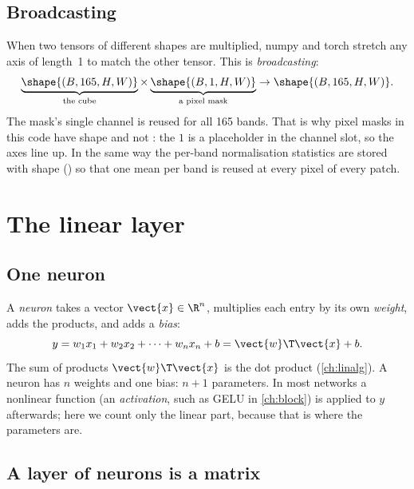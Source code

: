 \subsection{Broadcasting}

When two tensors of different shapes are multiplied, numpy and torch stretch any axis of length~1 to
match the other tensor. This is \emph{broadcasting}:
\[
\underbrace{\shape{(B, 165, H, W)}}_{\text{the cube}} \times
\underbrace{\shape{(B, 1, H, W)}}_{\text{a pixel mask}} \to \shape{(B, 165, H, W)}.
\]
The mask's single channel is reused for all 165 bands. That is why pixel masks in this code have shape
 and not : the $1$ is a placeholder in the channel slot, so the
axes line up. In the same way the per-band normalisation statistics are stored with shape
 () so that one
mean per band is reused at every pixel of every patch.

\section{The linear layer}\label{sec:shapes:linear}

\subsection{One neuron}

A \emph{neuron} takes a vector $\vect{x}\in\R^{n}$, multiplies each entry by its own
\emph{weight}, adds the products, and adds a \emph{bias}:
\begin{equation}\label{eq:shapes:neuron}
y = w_1x_1 + w_2x_2 + \dots + w_nx_n + b = \vect{w}\T\vect{x} + b .
\end{equation}
The sum of products $\vect{w}\T\vect{x}$ is the dot product (\cref{ch:linalg}). A neuron has $n$
weights and one bias: $n+1$ parameters. In most networks a nonlinear function (an
\emph{activation}, such as GELU in \cref{ch:block}) is applied to $y$
afterwards; here we count only the linear part, because that is where the parameters are.

\subsection{A layer of neurons is a matrix}

